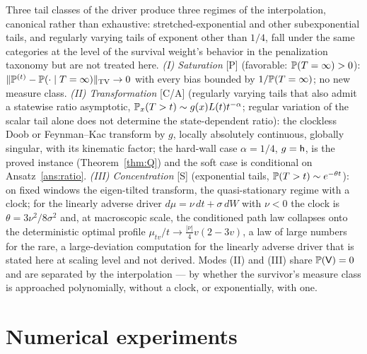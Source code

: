 \begin{theorem}
\label{thm:modes}
Three tail classes of the driver produce three regimes of the
interpolation, canonical rather than exhaustive: stretched-exponential
and other subexponential tails, and regularly varying tails of
exponent other than $1/4$, fall under the same categories at the
level of the survival weight's behavior in the penalization taxonomy
but are not treated here. \emph{(I) Saturation} [P] (favorable:
$\mathbb{P}(T=\infty)>0$): $\|\mathbb{P}^{(t)}-\mathbb{P}(\cdot\mid
T=\infty)\|_{\mathrm{TV}}\to0$ with every bias bounded by
$1/\mathbb{P}(T=\infty)$; no new measure class. \emph{(II) Transformation}
[C/A] (regularly varying tails that also admit a statewise ratio
asymptotic, $\mathbb{P}_x(T>t)\sim g(x)L(t)t^{-\alpha}$; regular variation of
the scalar tail alone does not determine the state-dependent ratio):
the clockless Doob or Feynman--Kac transform by $g$, locally absolutely
continuous, globally singular, with its kinematic factor; the hard-wall
case $\alpha=1/4$, $g=\mathsf{h}$, is the proved instance
(Theorem~\ref{thm:Q}) and the soft case is conditional on
Ansatz~\ref{ans:ratio}. \emph{(III) Concentration} [S]
(exponential tails, $\mathbb{P}(T>t)\sim e^{-\theta t}$): on fixed windows
the eigen-tilted transform, the quasi-stationary regime with a clock;
for the linearly adverse driver $d\mu=\nu\,dt+\sigma\,dW$ with
$\nu<0$ the clock is $\theta=3\nu^2/8\sigma^2$ and, at macroscopic
scale, the conditioned path law collapses onto the deterministic
optimal profile $\mu_{tv}/t\to\tfrac{|\nu|}4v(2-3v)$, a law of large
numbers for the rare, a large-deviation computation for the linearly
adverse driver that is stated here at scaling level and not derived. Modes (II) and (III) share $\mathbb{P}(\mathsf{V})=0$ and are separated by
the interpolation --- by whether the survivor's measure class is
approached polynomially, without a clock, or exponentially, with one.
\end{theorem}

\section{Numerical experiments}\label{sec:numerics}

